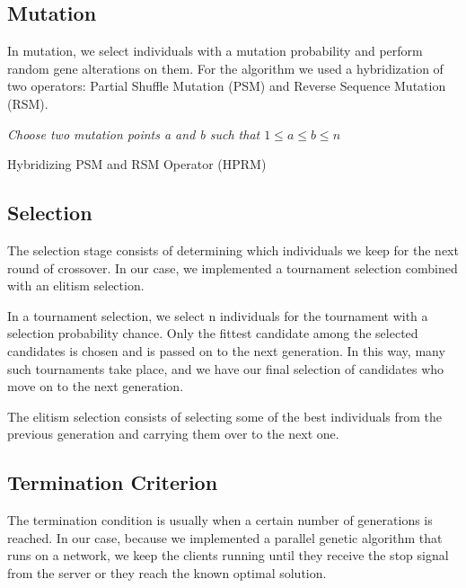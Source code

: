 \subsection{Mutation}
In mutation, we select individuals with a mutation probability and perform random gene alterations on them. For the algorithm we used a hybridization of two operators: Partial Shuffle Mutation (PSM) and Reverse Sequence Mutation (RSM)\cite{mutation}.
\newline
\begin{algorithm}
\BlankLine
\emph{Choose two mutation points a and b such that $1 \leq a \leq b \leq n$}\;
\caption{Hybridizing PSM and RSM Operator (HPRM)\cite{mutation}}\label{algo_disjdecomp}
\end{algorithm}

\subsection{Selection}
The selection stage consists of determining which individuals we keep for the next round of crossover. In our case, we implemented a tournament selection combined with an elitism selection.
\par
In a tournament selection, we select n individuals for the tournament with a selection probability chance. Only the fittest candidate among the selected candidates is chosen and is passed on to the next generation. In this way, many such tournaments take place, and we have our final selection of candidates who move on to the next generation.
\par
The elitism selection consists of selecting some of the best individuals from the previous generation and carrying them over to the next one.
\subsection{Termination Criterion}
The termination condition is usually when a certain number of generations is reached. In our case, because we implemented a parallel genetic algorithm that runs on a network, we keep the clients running until they receive the stop signal from the server or they reach the known optimal solution.
